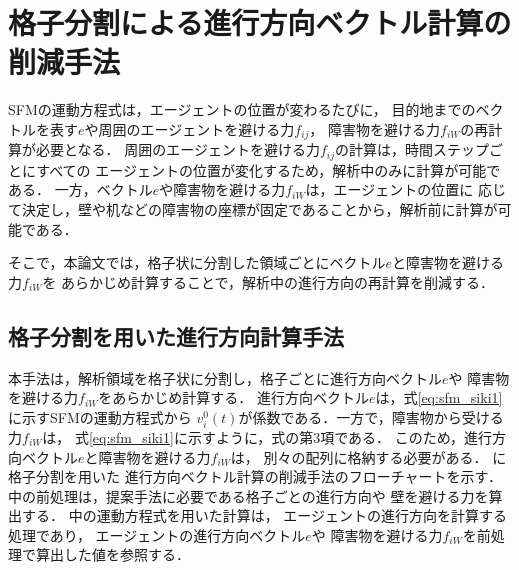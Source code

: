 \chapter{格子分割による進行方向ベクトル計算の削減手法}
\label{sec:method}
SFMの運動方程式は，エージェントの位置が変わるたびに，
目的地までのベクトルを表す$e$や周囲のエージェントを避ける力$f_{ij}$，
障害物を避ける力$f_{iW}$の再計算が必要となる．
周囲のエージェントを避ける力$f_{ij}$の計算は，時間ステップごとにすべての
エージェントの位置が変化するため，解析中のみに計算が可能である．
一方，ベクトル$e$や障害物を避ける力$f_{iW}$は，エージェントの位置に
応じて決定し，壁や机などの障害物の座標が固定であることから，解析前に計算が可能である．

そこで，本論文では，格子状に分割した領域ごとにベクトル$e$と障害物を避ける力$f_{iW}$を
あらかじめ計算することで，解析中の進行方向の再計算を削減する．

\section{格子分割を用いた進行方向計算手法}
本手法は，解析領域を格子状に分割し，格子ごとに進行方向ベクトル$e$や
障害物を避ける力$f_{iW}$をあらかじめ計算する．
進行方向ベクトル$e$は，式\eqref{eq:sfm_siki1}に示すSFMの運動方程式から
$v_i^0(t)$が係数である．一方で，障害物から受ける力$f_{iW}$は，
式\eqref{eq:sfm_siki1}に示すように，式の第3項である．
このため，進行方向ベクトル$e$と障害物を避ける力$f_{iW}$は，
別々の配列に格納する必要がある．
に格子分割を用いた
進行方向ベクトル計算の削減手法のフローチャートを示す．
中の前処理は，提案手法に必要である格子ごとの進行方向や
壁を避ける力を算出する．
中の運動方程式を用いた計算は，
エージェントの進行方向を計算する処理であり，
エージェントの進行方向ベクトル$e$や
障害物を避ける力$f_{iW}$を前処理で算出した値を参照する．


